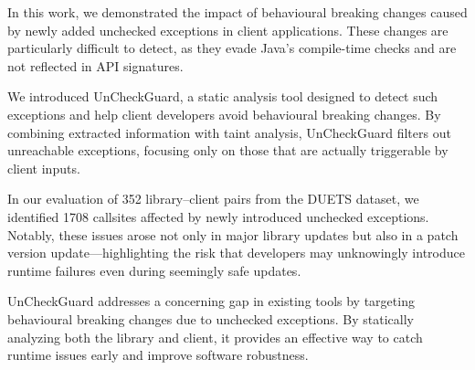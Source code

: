 In this work, we demonstrated the impact of behavioural breaking changes caused by newly added unchecked exceptions in client applications. These changes are particularly difficult to detect, as they evade Java's compile-time checks and are not reflected in API signatures.

We introduced UnCheckGuard, a static analysis tool designed to detect such exceptions and help client developers avoid behavioural breaking changes. By combining extracted information with taint analysis, UnCheckGuard filters out unreachable exceptions, focusing only on those that are actually triggerable by client inputs.

In our evaluation of 352 library–client pairs from the DUETS dataset, we identified 1708 callsites affected by newly introduced unchecked exceptions. Notably, these issues arose not only in major library updates but also in a patch version update—highlighting the risk that developers may unknowingly introduce runtime failures even during seemingly safe updates.

UnCheckGuard addresses a concerning gap in existing tools by targeting behavioural breaking changes due to unchecked exceptions. By statically analyzing both the library and client, it provides an effective way to catch runtime issues early and improve software robustness.
